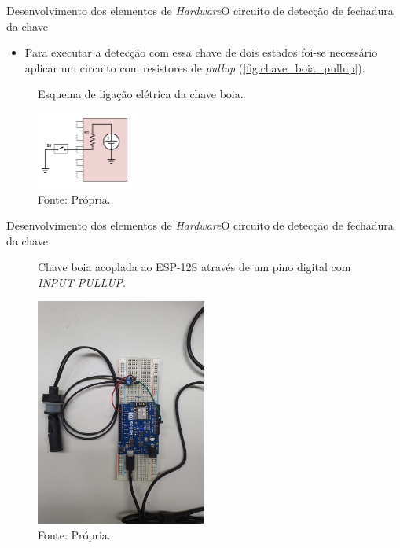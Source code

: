 \begin{frame}{Desenvolvimento dos elementos de \textit{Hardware}}{O circuito de detecção de fechadura da chave}
  \begin{itemize}
    \item Para executar a detecção com essa chave de dois estados foi-se necessário aplicar um circuito com resistores de \textit{pullup} (\autoref{fig:chave_boia_pullup}).
  \end{itemize}

\begin{figure}[H]
	\centering
	\caption{Esquema de ligação elétrica da chave boia.}
	\includegraphics[width=0.3\textwidth]{figuras/pullup.png}
	\caption*{\tiny{Fonte: Própria.}}
	\label{fig:chave_boia_pullup}
\end{figure}
\end{frame}

\begin{frame}{Desenvolvimento dos elementos de \textit{Hardware}}{O circuito de detecção de fechadura da chave}
  \begin{figure}[H]
    \centering
    \caption{Chave boia acoplada ao ESP-12S através de um pino digital com \textit{INPUT PULLUP}.}
    \includegraphics[width=0.5\textwidth]{figuras/teste_chave_boia.jpg}
    \caption*{\tiny{Fonte: Própria.}}
    \label{fig:chave_boia_pullup_teste}
  \end{figure}
  
\end{frame}

